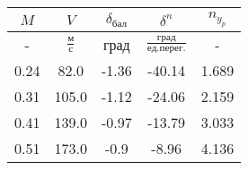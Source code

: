 \begin{tabular}{|c|c|c|c|c|}
\hline
$M$ & $V$ & $\delta_{бал}$ & $\delta^{n}$ & $n_{y_{p}}$ \\ 
\hline
- & $\frac{м}{с}$ & град & $\frac{град}{ед.перег.}$ & - \\ 
\hline
0.24 & 82.0 & -1.36 & -40.14 & 1.689 \\ 
\hline
0.31 & 105.0 & -1.12 & -24.06 & 2.159 \\ 
\hline
0.41 & 139.0 & -0.97 & -13.79 & 3.033 \\ 
\hline
0.51 & 173.0 & -0.9 & -8.96 & 4.136 \\ 
\hline
\end{tabular}